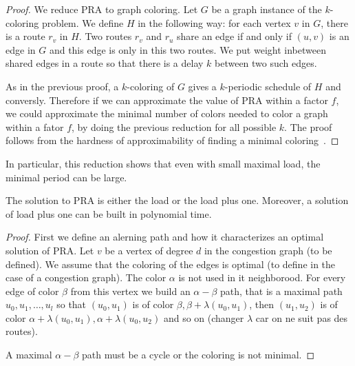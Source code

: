 \documentclass{article}
\begin{document}
\begin{proof}
 We reduce PRA to graph coloring. Let $G$ be a graph instance of the $k$-coloring problem. 
 We define $H$ in the following way: for each vertex $v$ in $G$, there is a route $r_v$ in $H$.
 Two routes $r_v$ and $r_u$ share an edge if and only if $(u,v)$ is an edge in $G$ and this edge is only in this two routes. 
 We put weight inbetween shared edges in a route so that there is a delay $k$ between two such edges. 
 
 As in the previous proof, a $k$-coloring of $G$ gives a $k$-periodic schedule of $H$
 and conversly. Therefore if we can approximate the value of PRA  within a factor $f$,
 we could approximate the minimal number of colors needed to color a graph within a fator $f$, 
 by doing the previous reduction for all possible $k$. The proof follows from the hardness of approximability
 of finding a minimal coloring~\cite{zuckerman2006linear}.
\end{proof}


In particular, this reduction shows that even with small maximal load, the 
minimal period can be large.




\begin{proposition}
The solution to PRA is either the load or the load plus one.
Moreover, a solution of  load plus one can be built in polynomial time.
\end{proposition}

\begin{proof}
 First we define an alerning path and how it characterizes an optimal solution of PRA.
 Let $v$ be a vertex of degree $d$ in the congestion graph (to be defined). We assume that the 
 coloring of the edges is optimal (to define in the case of a congestion graph). 
 The color $\alpha$ is not used in it neighborood. For every edge of color $\beta$ from this vertex
 we build an $\alpha - \beta$ path, that is a maximal path $u_0,u_1,\dots, u_l$ so that 
 $(u_0,u_1)$ is of color $\beta,\beta + \lambda(u_0,u_1)$, then $(u_1,u_2)$ is of color $\alpha + \lambda(u_0,u_1),\alpha +\lambda(u_0,u_2)$
 and so on (changer $\lambda$ car on ne suit pas des routes).
 
 A maximal $\alpha - \beta$ path must be a cycle or the coloring is not minimal.
\end{proof}
\end{document}
